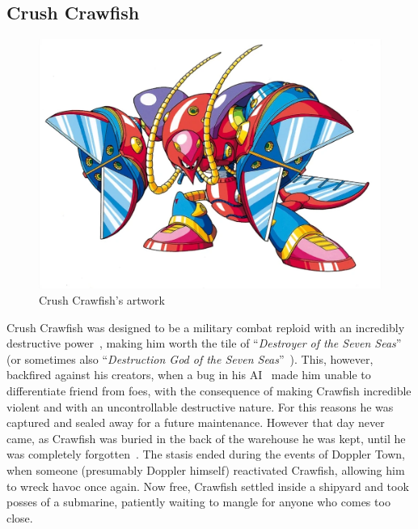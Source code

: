 \subsection{Crush Crawfish}\label{boss:Crush_crawfish}
\begin{figure}[htp]
	\centering
	\includegraphics[height=\portraitsize]{figures/X3/Crush_crawfish/crushcrawfish.png}
	\caption{Crush Crawfish's artwork~\cite{book:MMX_Complete_art}}
\end{figure}
Crush Crawfish was designed to be a military combat reploid with an incredibly destructive power~\cite{wayback:X3_resources}, making him worth the tile of ``\textit{Destroyer of the Seven Seas}''~\cite{wiki:Crush_crawfish} (or sometimes also ``\textit{Destruction God of the Seven Seas}''~\cite{wayback:X3_resources}). This, however, backfired against his creators, when a bug in his AI~\cite{wiki:Crush_crawfish} made him unable to differentiate friend from foes, with the consequence of making Crawfish incredible violent and with an uncontrollable destructive nature. For this reasons he was captured and sealed away for a future maintenance. However that day never came, as Crawfish was buried in the back of the warehouse he was kept, until he was completely forgotten~\cite{Xcoll1:Manual_X3}. The stasis ended during the events of Doppler Town, when someone (presumably Doppler himself) reactivated Crawfish, allowing him to wreck havoc once again. Now free, Crawfish settled inside a shipyard and took posses of a submarine, patiently waiting to mangle for anyone who comes too close.

